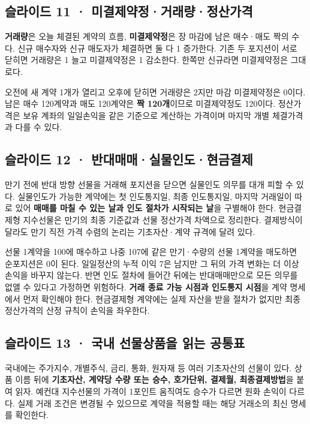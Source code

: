 \documentclass[11pt,a4paper]{article}
\begin{document}
\subsection{슬라이드 11 · 미결제약정·거래량·정산가격}
\textbf{거래량}은 오늘 체결된 계약의 흐름, \textbf{미결제약정}은 장 마감에 남은 매수·매도 짝의 수다. 신규 매수자와 신규 매도자가 체결하면 둘 다 1 증가한다. 기존 두 포지션이 서로 닫히면 거래량은 1 늘고 미결제약정은 1 감소한다. 한쪽만 신규라면 미결제약정은 그대로다.\par

오전에 새 계약 1개가 열리고 오후에 닫히면 거래량은 2지만 마감 미결제약정은 0이다. 남은 매수 120계약과 매도 120계약은 \textbf{짝 120개}이므로 미결제약정도 120이다. 정산가격은 보유 계좌의 일일손익을 같은 기준으로 계산하는 가격이며 마지막 개별 체결가격과 다를 수 있다.\par

\subsection{슬라이드 12 · 반대매매·실물인도·현금결제}
만기 전에 반대 방향 선물을 거래해 포지션을 닫으면 실물인도 의무를 대개 피할 수 있다. 실물인도가 가능한 계약에는 첫 인도통지일, 최종 인도통지일, 마지막 거래일이 따로 있어 \textbf{매매를 마칠 수 있는 날과 인도 절차가 시작되는 날}을 구별해야 한다. 현금결제형 지수선물은 만기의 최종 기준값과 선물 정산가격 차액으로 정리한다. 결제방식이 달라도 만기 직전 가격 수렴의 논리는 기초자산·계약 규격에 달려 있다.\par

선물 1계약을 100에 매수하고 나중 107에 같은 만기·수량의 선물 1계약을 매도하면 순포지션은 0이 된다. 일일정산의 누적 이익 7은 남지만 그 뒤의 가격 변화는 더 이상 손익을 바꾸지 않는다. 반면 인도 절차에 들어간 뒤에는 반대매매만으로 모든 의무를 없앨 수 있다고 가정하면 위험하다. \textbf{거래 종료 가능 시점과 인도통지 시점}을 계약 명세에서 먼저 확인해야 한다. 현금결제형 계약에는 실제 자산을 받을 절차가 없지만 최종 정산가격의 산정 규칙이 손익을 좌우한다.\par

\subsection{슬라이드 13 · 국내 선물상품을 읽는 공통표}
국내에는 주가지수, 개별주식, 금리, 통화, 원자재 등 여러 기초자산의 선물이 있다. 상품 이름 뒤에 \textbf{기초자산, 계약당 수량 또는 승수, 호가단위, 결제월, 최종결제방법}을 붙여 읽자. 예컨대 지수선물의 가격이 1포인트 움직여도 승수가 다르면 원화 손익이 다르다. 실제 거래 조건은 변경될 수 있으므로 계약을 적용할 때는 해당 거래소의 최신 명세를 확인한다.\par
\end{document}
